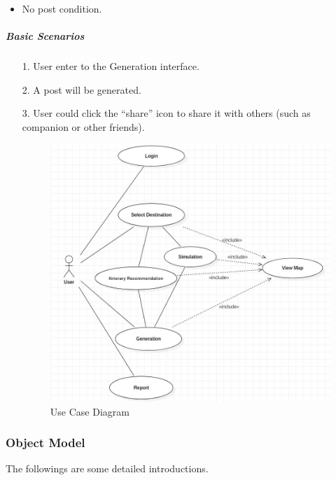 \documentclass[10pt]{article}
\begin{document}
\begin{itemize}
\begin{itemize}
			 \item No post condition.
		 \end{itemize}

		 \subparagraph{Basic Scenarios}
		 \begin{itemize}
			 \item[1.] User enter to the Generation interface.
			 \item[2.]	A post will be generated.
			 \item[3.] User could click the “share” icon to share it with others (such as companion or other friends).
			 
			 \begin{figure}[H]
				 \centering
				 \includegraphics[width=14cm]{usecase.jpg} 
				 \caption{Use Case Diagram}
				 \label{Use Case Diagram}
			 \end{figure}
			 
			 
		 \end{itemize}
\end{itemize}

\subsubsection{Object Model}
The followings are some detailed introductions.
\end{document}
